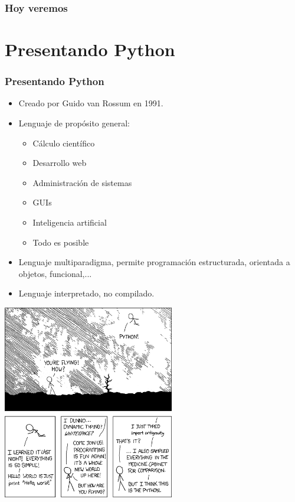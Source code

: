 \documentclass{beamer}
\title{\titulo}
\author{\autor}
\date{\fecha}
\begin{document}
	
\maketitle

\begin{frame}\frametitle{Hoy veremos}
	\tableofcontents
\end{frame}


\section{Presentando Python}

\begin{frame}\frametitle{Presentando Python}
	\begin{itemize}
		\item Creado por Guido van Rossum en 1991.
		\item Lenguaje de propósito general:
		\begin{itemize}
			\item Cálculo científico
			\item Desarrollo web
			\item Administración de sistemas
			\item GUIs
			\item Inteligencia artificial
			\item Todo es posible
		\end{itemize}
		\item Lenguaje multiparadigma, permite programación estructurada, orientada a objetos, funcional,...
		\item Lenguaje interpretado, no compilado.
	\end{itemize}
	
\end{frame}

\begin{frame}
	\centering
	\includegraphics[height=8.5cm]{fig/xkcd.png}
\end{frame}
\end{document}
